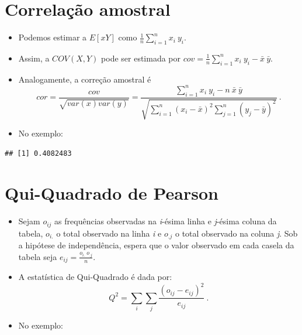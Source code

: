 \documentclass[
]{book}
\newenvironment{Shaded}{\begin{snugshade}}{\end{snugshade}}
\newcommand{\FunctionTok}[1]{\textcolor[rgb]{0.13,0.29,0.53}{\textbf{#1}}}
\newcommand{\NormalTok}[1]{#1}
\newcommand{\SpecialCharTok}[1]{\textcolor[rgb]{0.81,0.36,0.00}{\textbf{#1}}}
\begin{document}
\section{Correlação amostral}\label{correlauxe7uxe3o-amostral}

\begin{itemize}
\item
  Podemos estimar a \(E[xY]\) como \(\displaystyle \frac{1}{n}\sum_{i=1}^n x_i~y_i\).
\item
  Assim, a \(COV(X,Y)\) pode ser estimada por \(\displaystyle cov = \frac{1}{n}\sum_{i=1}^n x_i~y_i - \bar{x}~\bar{y}\).
\item
  Analogamente, a correção amostral é \[cor = \dfrac{cov}{\sqrt{var(x)var(y)}} = \dfrac{\displaystyle \sum_{i=1}^n x_i~y_i - n~\bar{x}~\bar{y}}{\displaystyle \sqrt{\sum_{i=1}^n (x_i-\bar{x})^2\sum_{j=1}^n(y_j-\bar{y})^2}}~.\]
\item
  No exemplo:
\end{itemize}

\begin{Shaded}
\end{Shaded}

\begin{verbatim}
## [1] 0.4082483
\end{verbatim}

\section{Qui-Quadrado de Pearson}\label{qui-quadrado-de-pearson}

\begin{itemize}
\item
  Sejam \(o_{ij}\) as frequências observadas na \emph{i}-ésima linha e \emph{j}-ésima coluna da tabela, \(o_{i.}\) o total observado na linha \emph{i} e \(o_{.j}\) o total observado na coluna \emph{j}. Sob a hipótese de independência, espera que o valor observado em cada casela da tabela seja \(\displaystyle e_{ij} = \frac{o_{i.}~o_{.j}}{n}\).
\item
  A estatística de Qui-Quadrado é dada por:
  \[Q^2 = \sum_i \sum_j \frac{(o_{ij}-e_{ij})^2}{e_{ij}}~.\]
\item
  No exemplo:
\end{itemize}
\end{document}
